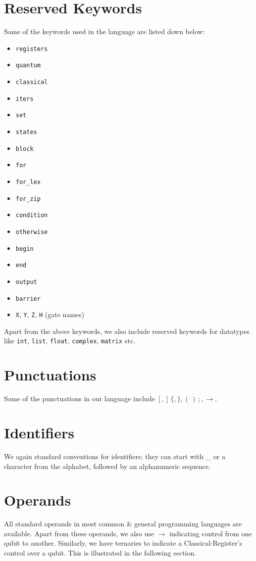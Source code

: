 \section{Reserved Keywords}
Some of the keywords used in the language are listed down below:
\begin{itemize}
    \item \texttt{registers}
    \item \texttt{quantum}
    \item \texttt{classical}
    \item \texttt{iters}
    \item \texttt{set}
    \item \texttt{states} 
    \item \texttt{block}
    \item \texttt{for}
    \item \texttt{for\_lex}
    \item \texttt{for\_zip}
    \item \texttt{condition}
    \item \texttt{otherwise}
    \item \texttt{begin}
    \item \texttt{end}
    \item \texttt{output}
    \item \texttt{barrier}
    \item \texttt{X}, \texttt{Y}, \texttt{Z}, \texttt{H} (gate names)
\end{itemize}

Apart from the above keywords, we also include reserved keywords for datatypes like \texttt{int}, \texttt{list}, \texttt{float}, \texttt{complex}, \texttt{matrix} etc.

\section{Punctuations}
Some of the punctuations in our language include $\left[,\right]\,\{,\},(\,)\,;,\rightarrow$.

\section{Identifiers}
We again standard conventions for identifiers; they can start with \_ or a character from the alphabet, followed by an alphanumeric sequence.

\section{Operands}
All standard operands in most common \& general programming languages are available. Apart from these operands, we also use $\rightarrow$ indicating control from one qubit to another.
Similarly, we have ternaries to indicate a Classical-Register's control over a qubit. This is illustrated in the following section.
